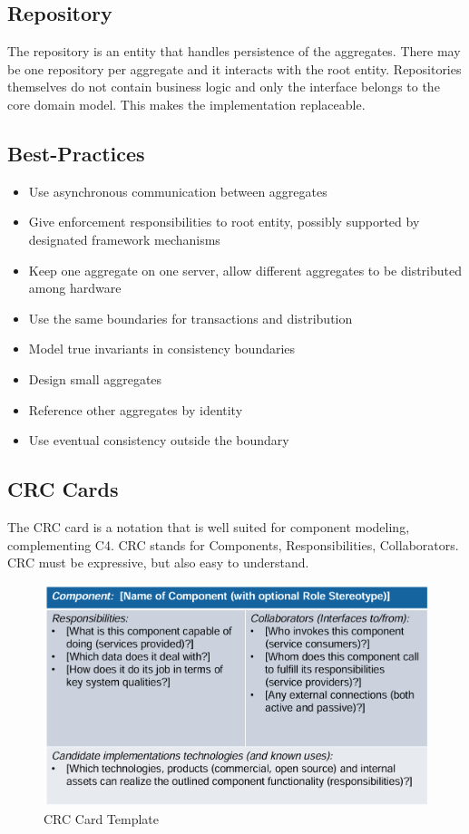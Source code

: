 \documentclass[../Main.tex]{subfiles}
\begin{document}
\subsection{Repository}
The repository is an entity that handles persistence of the aggregates.
There may be one repository per aggregate and it interacts with the root entity.
Repositories themselves do not contain business logic and only the interface
belongs to the core domain model. This makes the implementation replaceable.

\subsection{Best-Practices}
\begin{itemize}
    \item Use asynchronous communication between aggregates
    \item Give enforcement responsibilities to root entity, possibly supported by designated framework mechanisms
    \item Keep one aggregate on one server, allow different aggregates to be distributed among hardware
    \item Use the same boundaries for transactions and distribution
    \item Model true invariants in consistency boundaries
    \item Design small aggregates
    \item Reference other aggregates by identity
    \item Use eventual consistency outside the boundary
\end{itemize}

\subsection{CRC Cards}
The CRC card is a notation that is well suited for component modeling, 
complementing C4. CRC stands for Components, Responsibilities, Collaborators.
CRC must be expressive, but also easy to understand.

\begin{figure}[H]
    \centering
    \includegraphics[width=1\linewidth]{Images/crc-card.png}
    \caption{CRC Card Template}
\end{figure}
\end{document}

